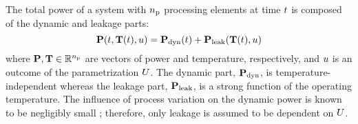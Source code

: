 The total power of a system with ${n_\text{p}}$ processing elements at time $t$ is composed of the dynamic and leakage parts:
\begin{equation} \elabel{total-power}
  \vP(\t, \vT(\t), \u) = \vP_\dyn(\t) + \vP_\leak(\vT(\t), \u)
\end{equation}
where $\mathbf{P}, \mathbf{T} \in \mathbb{R}^{n_\text{p}}$ are vectors of power and temperature, respectively, and $u$ is an outcome of the parametrization $U$. The dynamic part, $\mathbf{P}_{\text{dyn}}$, is temperature-independent whereas the leakage part, $\mathbf{P}_{\text{leak}}$, is a strong function of the operating temperature. The influence of process variation on the dynamic power is known to be negligibly small \cite{srivastava2010}; therefore, only leakage is assumed to be dependent on $U$.
